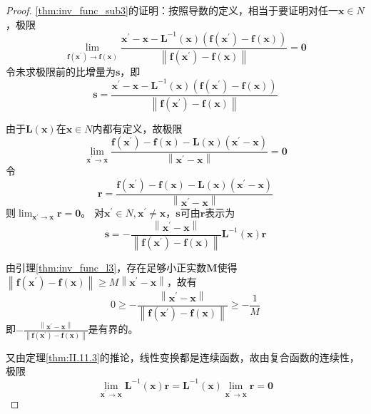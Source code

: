 \documentclass[main.tex]{subfiles}
\begin{document}
\begin{proof}
\ref{thm:inv_func_sub3}的证明：按照导数的定义，相当于要证明对任一$\mathbf{x}\in N$，极限
\[\lim_{\mathbf{f}\left(\mathbf{x}^\prime\right)\to\mathbf{f}\left(\mathbf{x}\right)}\frac{\mathbf{x}^\prime-\mathbf{x}-\mathbf{L}^{-1}\left(\mathbf{x}\right)\left(\mathbf{f}\left(\mathbf{x}^\prime\right)-\mathbf{f}\left(\mathbf{x}\right)\right)}{\left\|\mathbf{f}\left(\mathbf{x}^\prime\right)-\mathbf{f}\left(\mathbf{x}\right)\right\|}=\mathbf{0}\]
令未求极限前的比增量为$\mathbf{s}$，即
\[\mathbf{s}=\frac{\mathbf{x}^\prime-\mathbf{x}-\mathbf{L}^{-1}\left(\mathbf{x}\right)\left(\mathbf{f}\left(\mathbf{x}^\prime\right)-\mathbf{f}\left(\mathbf{x}\right)\right)}{\left\|\mathbf{f}\left(\mathbf{x}^\prime\right)-\mathbf{f}\left(\mathbf{x}\right)\right\|}\]

由于$\mathbf{L}\left(\mathbf{x}\right)$在$\mathbf{x}\in N$内都有定义，故极限
\[\lim_{\mathbf{x}^\prime\to\mathbf{x}}\frac{\mathbf{f}\left(\mathbf{x}^\prime\right)-\mathbf{f}\left(\mathbf{x}\right)-\mathbf{L}\left(\mathbf{x}\right)\left(\mathbf{x}^\prime-\mathbf{x}\right)}{\left\|\mathbf{x}^\prime-\mathbf{x}\right\|}=\mathbf{0}\]
令
\[\mathbf{r}=\frac{\mathbf{f}\left(\mathbf{x}^\prime\right)-\mathbf{f}\left(\mathbf{x}\right)-\mathbf{L}\left(\mathbf{x}\right)\left(\mathbf{x}^\prime-\mathbf{x}\right)}{\left\|\mathbf{x}^\prime-\mathbf{x}\right\|}\]
则$\lim_{\mathbf{x}^\prime\to\mathbf{x}}\mathbf{r}=\mathbf{0}$。
对$\mathbf{x}^\prime\in N,\mathbf{x}^\prime\neq\mathbf{x}$，$\mathbf{s}$可由$\mathbf{r}$表示为
\[
\mathbf{s}=-\frac{\left\|\mathbf{x}^\prime-\mathbf{x}\right\|}{\left\|\mathbf{f}\left(\mathbf{x}^\prime\right)-\mathbf{f}\left(\mathbf{x}\right)\right\|}\mathbf{L}^{-1}\left(\mathbf{x}\right)\mathbf{r}
\]

由引理\ref{thm:inv_func_l3}，存在足够小正实数$\mathbf{M}$使得$\left\|\mathbf{f}\left(\mathbf{x}^\prime\right)-\mathbf{f}\left(\mathbf{x}\right)\right\|\geq M\left\|\mathbf{x}^\prime-\mathbf{x}\right\|$，故有
\[0\geq-\frac{\left\|\mathbf{x}^\prime-\mathbf{x}\right\|}{\left\|\mathbf{f}\left(\mathbf{x}^\prime\right)-\mathbf{f}\left(\mathbf{x}\right)\right\|}\geq-\frac{1}{M}\]
即$-\frac{\left\|\mathbf{x}^\prime-\mathbf{x}\right\|}{\left\|\mathbf{f}\left(\mathbf{x}^\prime\right)-\mathbf{f}\left(\mathbf{x}\right)\right\|}$是有界的。

又由定理\ref{thm:II.11.3}的推论，线性变换都是连续函数，故由复合函数的连续性，极限
\[\lim_{\mathbf{x}^\prime\to\mathbf{x}}\mathbf{L}^{-1}\left(\mathbf{x}\right)\mathbf{r}=\mathbf{L}^{-1}\left(\mathbf{x}\right)\lim_{\mathbf{x}^\prime\to\mathbf{x}}\mathbf{r}=\mathbf{0}\]


\end{proof}
\end{document}
